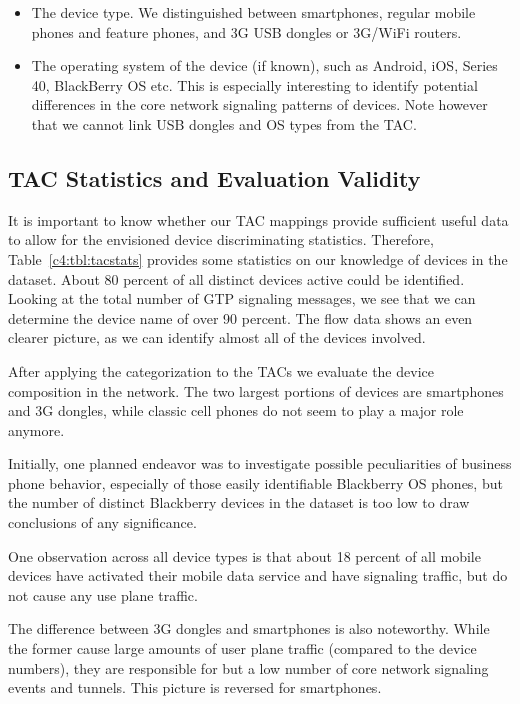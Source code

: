 \begin{itemize}
\item The device type. We distinguished between smartphones, regular mobile phones and feature phones, and 3G USB dongles or 3G/WiFi routers.

\item The operating system of the device (if known), such as Android, iOS, Series 40, BlackBerry OS etc. This is especially interesting to identify potential differences in the core network signaling patterns of devices. Note however that we cannot link USB dongles and OS types from the \ac{TAC}.

\end{itemize}



\subsection{\acs{TAC} Statistics and Evaluation Validity}

It is important to know whether our \ac{TAC} mappings provide sufficient useful data to allow for the envisioned device discriminating statistics. Therefore, Table~\ref{c4:tbl:tacstats} provides some statistics on our knowledge of devices in the dataset. About 80 percent of all  distinct devices active could be identified. Looking at the total number of \ac{GTP} signaling messages, we see that we can determine the device name of over 90 percent.
The flow data shows an even clearer picture, as we can identify almost all of the devices involved.


After applying the categorization to the \acp{TAC} we evaluate the device composition in the network. The two largest portions of devices are smartphones  and 3G dongles, while classic cell phones do not seem to play a major role anymore. 


Initially, one planned endeavor was to investigate possible peculiarities of business phone behavior, especially of those easily identifiable Blackberry OS phones, but the number of distinct Blackberry devices in the dataset is too low to draw conclusions of any significance.

One observation across all device types is that about 18 percent of all mobile devices have activated their mobile data service and have signaling traffic, but do not cause any use plane traffic.

The difference between 3G dongles and smartphones is also noteworthy. While the former cause large amounts of user plane traffic (compared to the device numbers), they are responsible for but a low number of core network signaling events and tunnels. This picture is reversed for smartphones.


